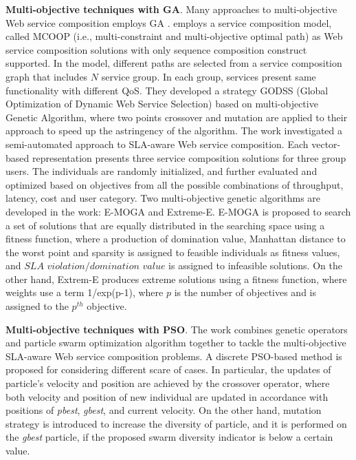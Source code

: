 \textbf{Multi-objective techniques with GA}. Many approaches to multi-objective Web service composition employs GA \cite{liu2005dynamic}.  \cite{liu2005dynamic} employs a service composition model, called  MCOOP (i.e., multi-constraint and multi-objective optimal path) as Web service composition solutions with only sequence composition construct supported. In the model, different paths are selected from a service composition graph that includes $N$ service group. In each group, services present same functionality with different QoS. They developed a strategy GODSS (Global Optimization of Dynamic Web Service Selection) based on multi-objective Genetic Algorithm, where two points crossover and mutation are applied to their approach to speed up the astringency of the algorithm. The work \cite{wada2012e3} investigated a semi-automated approach to SLA-aware Web service composition.  Each vector-based representation presents three service composition solutions for three group users.  The individuals are randomly initialized, and further evaluated and optimized based on objectives from all the possible combinations of throughput, latency, cost and user category. Two multi-objective genetic algorithms are developed in the work: E-MOGA and Extreme-E. E-MOGA is proposed to search a set of solutions that are equally distributed in the searching space using a fitness function, where a production of domination value,  Manhattan distance to the worst point and sparsity is assigned to feasible individuals as fitness values, and $SLA$ $violation /domination$ $value$ is assigned to infeasible solutions. On the other hand, Extrem-E produces extreme solutions using a fitness function, where weights use a term 1/exp(p-1), where $p$ is the number of objectives and is assigned to the $p^{th}$ objective.

\textbf{Multi-objective techniques with PSO}. The work \cite{yin2014hybrid} combines genetic operators and particle swarm optimization algorithm together to tackle the multi-objective SLA-aware Web service composition problems. A discrete PSO-based method is proposed for  considering different scare of cases. In particular, the updates of particle's velocity and position are achieved by the crossover operator, where both velocity and position of new individual are updated in accordance with positions of \textit{pbest}, \textit{gbest}, and current velocity. On the other hand, mutation strategy is introduced to increase the diversity of particle, and it is performed on the \textit{gbest} particle, if the proposed swarm diversity indicator is below a certain value.

